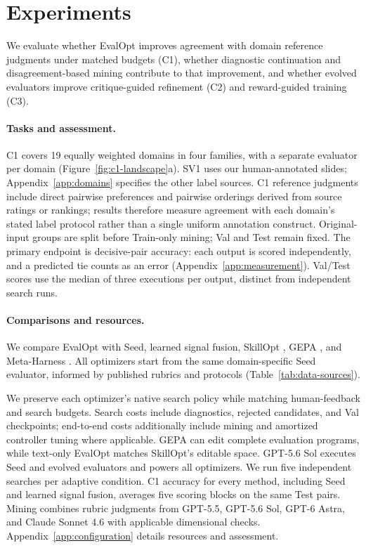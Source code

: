 \section{Experiments}
\label{sec:experiments}
We evaluate whether EvalOpt improves agreement with domain reference judgments under matched budgets (C1), whether diagnostic continuation and disagreement-based mining contribute to that improvement, and whether evolved evaluators improve critique-guided refinement (C2) and reward-guided training (C3).

\paragraph{Tasks and assessment.}
C1 covers 19 equally weighted domains in four families, with a separate evaluator per domain (Figure~\ref{fig:c1-landscape}a).
SV1 uses our human-annotated slides; Appendix~\ref{app:domains} specifies the other label sources.
C1 reference judgments include direct pairwise preferences and pairwise orderings derived from source ratings or rankings; results therefore measure agreement with each domain's stated label protocol rather than a single uniform annotation construct.
Original-input groups are split before Train-only mining; Val and Test remain fixed.
The primary endpoint is decisive-pair accuracy: each output is scored independently, and a predicted tie counts as an error (Appendix~\ref{app:measurement}). Val/Test scores use the median of three executions per output, distinct from independent search runs.

\paragraph{Comparisons and resources.}
We compare EvalOpt with Seed, learned signal fusion, SkillOpt \citep{yang2026skillopt}, GEPA \citep{agrawal2026gepa}, and Meta-Harness \citep{lee2026metaharness}.
All optimizers start from the same domain-specific Seed evaluator, informed by published rubrics and protocols (Table~\ref{tab:data-sources}).

We preserve each optimizer's native search policy while matching human-feedback and search budgets.
Search costs include diagnostics, rejected candidates, and Val checkpoints; end-to-end costs additionally include mining and amortized controller tuning where applicable.
GEPA can edit complete evaluation programs, while text-only EvalOpt matches SkillOpt's editable space.
GPT-5.6 Sol executes Seed and evolved evaluators and powers all optimizers.
We run five independent searches per adaptive condition.
C1 accuracy for every method, including Seed and learned signal fusion, averages five scoring blocks on the same Test pairs.
Mining combines rubric judgments from GPT-5.5, GPT-5.6 Sol, GPT-6 Astra, and Claude Sonnet 4.6 with applicable dimensional checks.
Appendix~\ref{app:configuration} details resources and assessment.

